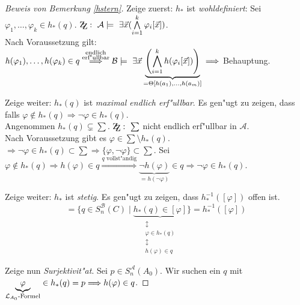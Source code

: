 \documentclass[a4paper,12pt,numbers=noenddot,parskip=full]{scrartcl}
\newcommand{\Exists}{~\exists}
\newcommand{\scrL}{\mathcal{L}}
\newcommand{\scrA}{\mathcal{A}}
\newcommand{\scrB}{\mathcal{B}}
\newcommand{\zz}{\mathrm{Z\kern-.3em\raise-0.5ex\hbox{Z}}:~}
\theoremstyle{dotless}
\begin{document}
\begin{proof}[Beweis von Bemerkung \ref{hstern}]
	Zeige zuerst: $h_*$ ist \emph{wohldefiniert}: Sei $\varphi_1, \dots, \varphi_k \in h_*(q)$. $\zz \scrA \models \Exists \vec{x}(\bigwedge\limits_{i=1}^k \varphi_i [\vec{x}])$.\\
	Nach Voraussetzung gilt: $h(\varphi_1), \dots, h(\varphi_k) \in q \overset{\substack{\text{endlich}\\\text{erf"ullbar}}}{\Longrightarrow} \scrB \models \Exists \vec{x} \underbrace{\left(\bigwedge\limits_{i=1}^k h(\varphi_i[\vec{x}])\right)}_{= \Theta[h(a_1), \dots, h(a_m)]} \\\Longrightarrow$ Behauptung.
	
	Zeige weiter: $h_*(q)$ ist \emph{maximal endlich erf"ullbar}. Es gen"ugt zu zeigen, dass falls $\varphi \notin h_*(q) \Longrightarrow \lnot \varphi \in h_*(q)$.\\
	Angenommen $h_*(q) \subsetneq \sum$. $\zz \sum$ nicht endlich erf"ullbar in $\scrA$.\\
	Nach Voraussetzung gibt es $\varphi \in \sum \setminus h_*(q)$. $\Longrightarrow \lnot \varphi \in h_*(q) \subset \sum \Longrightarrow \{\varphi, \lnot \varphi \} \subset \sum$. Sei $\varphi \notin h_*(q) \Longrightarrow h(\varphi) \in q \overset{q \text{ vollst"andig}}{\Longrightarrow} \underbrace{\lnot h(\varphi)}_{=h(\lnot \varphi)} \in q \Longrightarrow \lnot \varphi \in h_*(q)$.
	
	Zeige weiter: $h_*$ ist \emph{stetig}. Es gen"ugt zu zeigen, dass $h_*^{-1}([\varphi])$ offen ist.
	\begin{equation*}
		[h(\overbrace{\varphi}^{\scrL_{B_0} \text{-Formel}})] = \{q \in S_n^\scrB (C) \mid \underbrace{h_*(q) \in [\varphi]}_{\substack{\updownarrow\\\varphi \in h_*(q)\\\updownarrow\\h(\varphi) \in q}} \} = h_*^{-1}([\varphi])
	\end{equation*}
	
	Zeige nun \emph{Surjektivit"at}. Sei $p \in S_n^\scrA (A_0)$. Wir suchen ein $q$ mit $\underbrace{\varphi}_{\scrL_{A_0}\text{-Formel}} \in h_*(q) = p \\\Longrightarrow h(\varphi) \in q$.
	

\end{proof}
\end{document}

